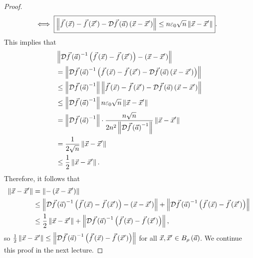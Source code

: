 \documentclass[main.tex]{subfiles}
\begin{document}
\begin{proof}
\begin{align*}
        &\iff \boxed{\norm{\vf\parens{\vx} - \vf\parens{\vx'} - \mathcal{D}\vf\parens{\va}\parens{\vx - \vx'}} \le n\varepsilon_0 \sqrt{n}\norm{\vx - \vx'}}.
    \end{align*}
    This implies that
    \begin{align*}
        &\norm{\mathcal{D}\vf\parens{\va}^{-1}\parens{\vf\parens{\vx} - \vf\parens{\vx'}} - \parens{\vx - \vx'}} \\
        &= \norm{\mathcal{D}\vf\parens{\va}^{-1}\parens{\vf\parens{\vx} - \vf\parens{\vx'} - \mathcal{D}\vf\parens{\va}\parens{\vx - \vx'}}} \\
        &\le \norm{\mathcal{D}\vf\parens{\va}^{-1}}\norm{\vf\parens{\vx} - \vf\parens{\vx'} - \mathcal{D}\vf\parens{\va}\parens{\vx - \vx'}} \\
        &\le \norm{\mathcal{D}\vf\parens{\va}^{-1}}n\varepsilon_0 \sqrt{n}\norm{\vx - \vx'} \\
        &= \norm{\mathcal{D}\vf\parens{\va}^{-1}}\cdot \frac{n\sqrt{n}}{2n^2\norm{\mathcal{D}\vf\parens{\va}^{-1}}}\norm{\vx - \vx'} \\
        &= \frac{1}{2\sqrt{n}}\norm{\vx - \vx'} \\
        &\le \frac{1}{2}\norm{\vx - \vx'}.
    \end{align*}
    Therefore, it follows that
    \begin{align*}
        \norm{\vx - \vx'} &= \norm{-\parens{\vx - \vx'}} \\
        &\le \norm{\mathcal{D}\vf\parens{\va}^{-1}\parens{\vf\parens{\vx} - \vf\parens{\vx'}} - \parens{\vx - \vx'}} + \norm{\mathcal{D}\vf\parens{\va}^{-1}\parens{\vf\parens{\vx} - \vf\parens{\vx'}}} \\
        &\le \frac{1}{2}\norm{\vx - \vx'} + \norm{\mathcal{D}\vf\parens{\va}^{-1}\parens{\vf\parens{\vx} - \vf\parens{\vx'}}},
    \end{align*}
    so $\frac{1}{2}\norm{\vx - \vx'} \le \norm{\mathcal{D}\vf\parens{\va}^{-1}\parens{\vf\parens{\vx} - \vf\parens{\vx'}}}$ for all $\vx, \vx'\in B_\rho\parens{\va}$. We continue this proof in the next lecture.
\end{proof}
\end{document}
